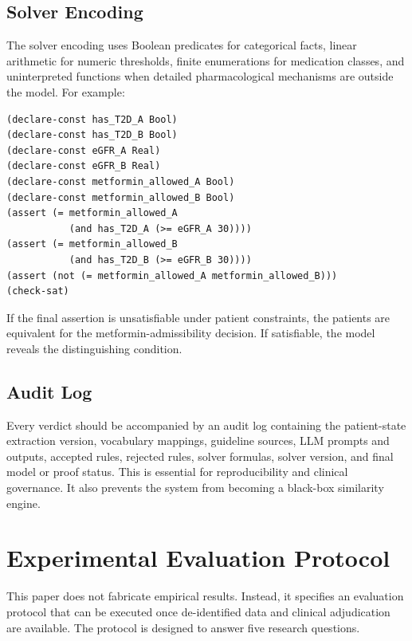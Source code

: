 \documentclass[english,5p,twocolumn,preprint]{elsarticle}
\begin{document}
\subsection{Solver Encoding}
The solver encoding uses Boolean predicates for categorical facts, linear arithmetic for numeric thresholds, finite enumerations for medication classes, and uninterpreted functions when detailed pharmacological mechanisms are outside the model. For example:
\begin{lstlisting}[language={},caption={Simplified SMT-style representation.}]
(declare-const has_T2D_A Bool)
(declare-const has_T2D_B Bool)
(declare-const eGFR_A Real)
(declare-const eGFR_B Real)
(declare-const metformin_allowed_A Bool)
(declare-const metformin_allowed_B Bool)
(assert (= metformin_allowed_A
           (and has_T2D_A (>= eGFR_A 30))))
(assert (= metformin_allowed_B
           (and has_T2D_B (>= eGFR_B 30))))
(assert (not (= metformin_allowed_A metformin_allowed_B)))
(check-sat)
\end{lstlisting}
If the final assertion is unsatisfiable under patient constraints, the patients are equivalent for the metformin-admissibility decision. If satisfiable, the model reveals the distinguishing condition.

\subsection{Audit Log}
Every verdict should be accompanied by an audit log containing the patient-state extraction version, vocabulary mappings, guideline sources, LLM prompts and outputs, accepted rules, rejected rules, solver formulas, solver version, and final model or proof status. This is essential for reproducibility and clinical governance. It also prevents the system from becoming a black-box similarity engine.


\section{Experimental Evaluation Protocol}
This paper does not fabricate empirical results. Instead, it specifies an evaluation protocol that can be executed once de-identified data and clinical adjudication are available. The protocol is designed to answer five research questions.
\end{document}
